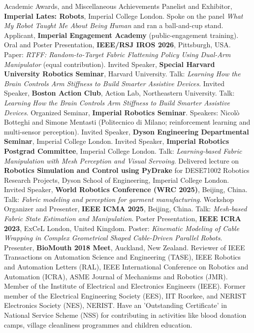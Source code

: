 \begin{rubric}{Academic Awards, and Miscellaneous Achievements}
    \entry*[29/10/26] Panelist and Exhibitor, \textbf{Imperial Lates: Robots}, Imperial College London. Spoke on the panel \textit{What My Robot Taught Me About Being Human} and ran a ball-and-cup stand.
    \entry*[2026] Applicant, \textbf{Imperial Engagement Academy} (public-engagement training).
    \entry*[27/09/26] Oral and Poster Presentation, \textbf{IEEE/RSJ IROS 2026}, Pittsburgh, USA. Paper: \textit{RTFF: Random-to-Target Fabric Flattening Policy Using Dual-Arm Manipulator} (equal contribution).
    \entry*[24/09/26] Invited Speaker, \textbf{Special Harvard University Robotics Seminar}, Harvard University. Talk: \textit{Learning How the Brain Controls Arm Stiffness to Build Smarter Assistive Devices}.
    \entry*[23/09/26] Invited Speaker, \textbf{Boston Action Club}, Action Lab, Northeastern University. Talk: \textit{Learning How the Brain Controls Arm Stiffness to Build Smarter Assistive Devices}.
    \entry*[27/08/26] Organized Seminar, \textbf{Imperial Robotics Seminar}. Speakers: Nicol\`o Botteghi and Simone Mentasti (Politecnico di Milano; reinforcement learning and multi-sensor perception).
    \entry*[05/02/26] Invited Speaker, \textbf{Dyson Engineering Departmental Seminar}, Imperial College London.
    \entry*[29/01/26] Invited Speaker, \textbf{Imperial Robotics Postgrad Committee}, Imperial College London. Talk: \textit{Learning-based Fabric Manipulation with Mesh Perception and Visual Servoing}.
    \entry*[28/01/26] Delivered lecture on \textbf{Robotics Simulation and Control using PyDrake} for DESE71002 Robotics Research Projects, Dyson School of Engineering, Imperial College London.
    \entry*[08/08/25] Invited Speaker, \textbf{World Robotics Conference (WRC 2025)}, Beijing, China. Talk: \textit{Fabric modeling and perception for garment manufacturing}.
    \entry*[03/08/25] Workshop Organizer and Presenter, \textbf{IEEE ICMA 2025}, Beijing, China. Talk: \textit{Mesh-based Fabric State Estimation and Manipulation}.
    \entry*[29/05/23] Poster Presentation, \textbf{IEEE ICRA 2023}, ExCeL London, United Kingdom. Poster: \textit{Kinematic Modeling of Cable Wrapping in Complex Geometrical Shaped Cable-Driven Parallel Robots}.
    \entry*[2018] Presenter, \textbf{BioMouth 2018 Meet}, Auckland, New Zealand.
    \entry*[2021 - Current] Reviewer of IEEE Transactions on Automation
    Science and Engineering (TASE), IEEE Robotics and Automation Letters (RAL), IEEE International Conference on Robotics and Automation (ICRA), ASME Journal of Mechanisms and Robotics (JMR).
    \entry*[2017 - Current] Member of the Institute of Electrical and Electronics Engineers (IEEE).
    \entry*[2014] Former member of the Electrical Engineering Society (EES), IIT Roorkee, and NERIST Electronics Society (NES), NERIST.
    \entry*[2006] Have an 'Outstanding  Certificate' in National Service Scheme (NSS) for contributing  in activities like blood donation camps, village cleanliness programmes and children education.
    \end{rubric}
